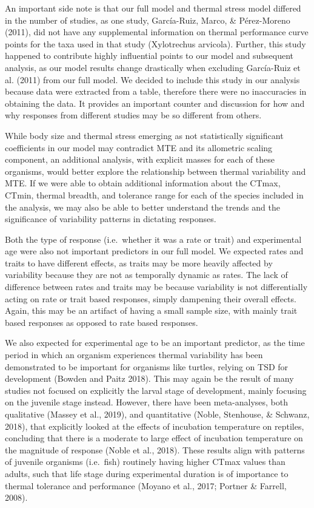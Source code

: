\documentclass[12pt,twoside]{reedthesis}
\begin{document}
An important side note is that our full model and thermal stress model differed in the number of studies, as one study, García-Ruiz, Marco, \& Pérez-Moreno (2011), did not have any supplemental information on thermal performance curve points for the taxa used in that study (Xylotrechus arvicola). Further, this study happened to contribute highly influential points to our model and subsequent analysis, as our model results change drastically when excluding García-Ruiz et al. (2011) from our full model. We decided to include this study in our analysis because data were extracted from a table, therefore there were no inaccuracies in obtaining the data. It provides an important counter and discussion for how and why responses from different studies may be so different from others.

While body size and thermal stress emerging as not statistically significant coefficients in our model may contradict MTE and its allometric scaling component, an additional analysis, with explicit masses for each of these organisms, would better explore the relationship between thermal variability and MTE. If we were able to obtain additional information about the CTmax, CTmin, thermal breadth, and tolerance range for each of the species included in the analysis, we may also be able to better understand the trends and the significance of variability patterns in dictating responses.

Both the type of response (i.e.~whether it was a rate or trait) and experimental age were also not important predictors in our full model. We expected rates and traits to have different effects, as traits may be more heavily affected by variability because they are not as temporally dynamic as rates. The lack of difference between rates and traits may be because variability is not differentially acting on rate or trait based responses, simply dampening their overall effects. Again, this may be an artifact of having a small sample size, with mainly trait based responses as opposed to rate based responses.

We also expected for experimental age to be an important predictor, as the time period in which an organism experiences thermal variability has been demonstrated to be important for organisms like turtles, relying on TSD for development (Bowden and Paitz 2018). This may again be the result of many studies not focused on explicitly the larval stage of development, mainly focusing on the juvenile stage instead. However, there have been meta-analyses, both qualitative (Massey et al., 2019), and quantitative (Noble, Stenhouse, \& Schwanz, 2018), that explicitly looked at the effects of incubation temperature on reptiles, concluding that there is a moderate to large effect of incubation temperature on the magnitude of response (Noble et al., 2018). These results align with patterns of juvenile organisms (i.e.~fish) routinely having higher CTmax values than adults, such that life stage during experimental duration is of importance to thermal tolerance and performance (Moyano et al., 2017; Portner \& Farrell, 2008).
\end{document}
